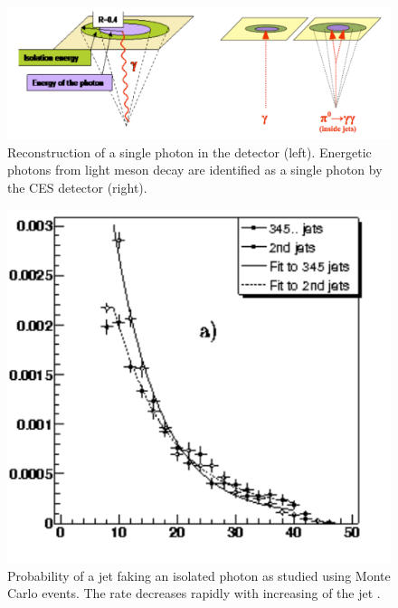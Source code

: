 \begin{figure}[p]
 \centering
 \includegraphics[scale=0.5,keepaspectratio=true]{./JetFakingPhotonIllustration.pdf}
 \caption{Reconstruction of a single photon in the detector (left). Energetic photons from light meson decay are identified as a single photon by the CES detector (right).}
 \label{fig:JetFakingPhoton}
\end{figure}


\begin{figure}[p]
\begin{center}
 \includegraphics[scale=1.6,keepaspectratio=true]{./JetFakeRate.pdf}
 \caption{Probability of a jet faking an isolated photon as studied using Monte Carlo events. The rate decreases rapidly with increasing \et of the jet \cite{cdfnote:6363}.}
 \label{fig:JetFakeRate}
\end{center}
\end{figure}

